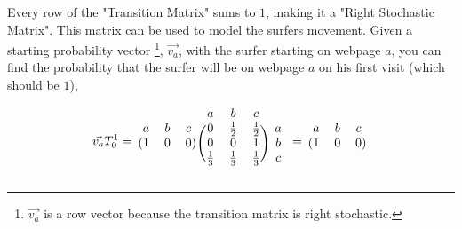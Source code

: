 \documentclass[12pt]{article}
\begin{document}
Every row of the "Transition Matrix" sums to $1$, making it a "Right Stochastic Matrix". This matrix can be used to model the surfers movement. Given a starting probability vector \footnote{$\vec{v_a}$ is a row vector because the transition matrix is right stochastic.}, $\vec{v_a}$, with the surfer starting on webpage $a$, you can find the probability that the surfer will be on webpage $a$ on his first visit (which should be $1$),

\iffalse

\[
\vec{v_a} T_0^1 =
\begin{pmatrix}
  1 & 0 & 0 \\
\end{pmatrix}
%
\begin{pmatrix}
  0 & \frac{1}{2} & \frac{1}{2} \\
  0 & 0 & 1  \\
  \frac{1}{3} & \frac{1}{3} & \frac{1}{3} \\
\end{pmatrix}
%
=
%
\begin{pmatrix}
  1 & 0 & 0 \\
\end{pmatrix}
\]

\fi

%
%
\[
%
\vec{v_a} T_0^1 =
%
\begin{blockarray}{ccc}
a & b & c \\
\begin{block}{(ccc)}
  1 & 0 & 0 \\
\end{block}
\end{blockarray}
%
\begin{blockarray}{cccc}
a & b & c \\
\begin{block}{(ccc)c}
  0 & \frac{1}{2} & \frac{1}{2} & a \\
  0 & 0 & 1 & b \\
  \frac{1}{3} & \frac{1}{3} & \frac{1}{3} & c \\
\end{block}
\end{blockarray}
%
=
%
\begin{blockarray}{ccc}
a & b & c \\
\begin{block}{(ccc)}
  1 & 0 & 0 \\
\end{block}
\end{blockarray}
\]
\end{document}
